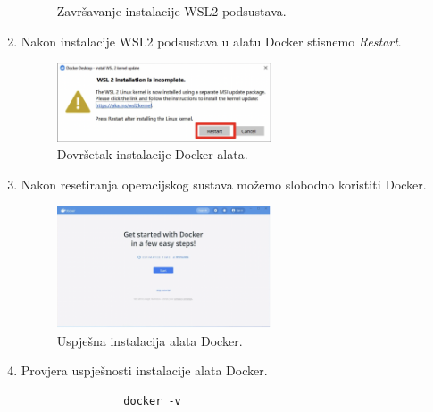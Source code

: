 \begin{enumerate}
\begin{figure}[h]
				\caption{Završavanje instalacije WSL2 podsustava.}
			\end{figure}
			\newpage
			\item Nakon instalacije WSL2 podsustava u alatu Docker stisnemo \textit{Restart}.
			\begin{figure}[h]
				\centering
				\includegraphics[width=0.6\textwidth]{slike/docker_install/10.png}
				\caption{Dovršetak instalacije Docker alata.}
			\end{figure}
			\item Nakon resetiranja operacijskog sustava možemo slobodno koristiti Docker.
			\begin{figure}[h]
				\centering
				\includegraphics[width=0.6\textwidth]{slike/docker_install/11.png}
				\caption{Uspješna instalacija alata Docker.}
			\end{figure}
			\item Provjera uspješnosti instalacije alata Docker.
			\begin{verbatim}
				docker -v
			\end{verbatim}
		\end{enumerate}


